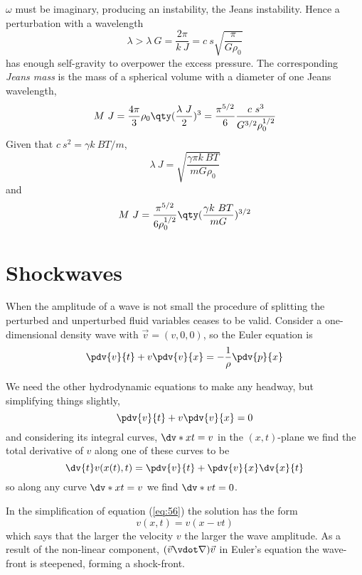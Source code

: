 $\omega$ must be imaginary, producing an instability, the Jeans
instability. Hence a perturbation with a wavelength
\[ \lambda > \lambda~G = \frac{2 \pi}{k~J} = c~s \sqrt{\frac{\pi}{G
    \rho_0}} \] has enough self-gravity to overpower the excess
pressure. The corresponding \emph{Jeans mass} is the mass of a
spherical volume with a diameter of one Jeans wavelength,
\begin{equation}
  \label{eq:70}
  M~J = \frac{4 \pi}{3} \rho_0 \qty( \frac{\lambda~J}{2})^3 = \frac{\pi^{5/2}}{6} \frac{c~s^3}{G^{3/2} \rho_0^{1/2}}
\end{equation}
Given that $c~s^2 = \gamma k~B T/m$,
\begin{equation}
  \label{eq:71}
  \lambda~J = \sqrt{\frac{\gamma \pi k~B T}{m G \rho_0}}
\end{equation}
and
\begin{equation}
  \label{eq:72}
  M~J = \frac{\pi^{5/2}}{6 \rho_0^{1/2}} \qty( \frac{\gamma k~B T}{m G} )^{3/2}
\end{equation}

\section{Shockwaves}
\label{sec:shockwaves}

When the amplitude of a wave is not small the procedure of splitting
the perturbed and unperturbed fluid variables ceases to be
valid. Consider a one-dimensional density wave with $\vec{v} =
(v,0,0)$, so the Euler equation is
\begin{equation}
  \label{eq:56}
  \pdv{v}{t} + v \pdv{v}{x} = - \frac{1}{\rho} \pdv{p}{x}
\end{equation}

We need the other hydrodynamic equations to make any headway, but
simplifying things slightly,
\begin{equation*}
  \pdv{v}{t} + v \pdv{v}{x} = 0
\end{equation*}
and considering its integral curves, $\dv*{x}{t} = v$ in the
$(x,t)$-plane we find the total derivative of $v$ along one of these
curves to be
\[ \dv{t} v(x(t),t) = \pdv{v}{t} + \pdv{v}{x} \dv{x}{t} \]
so along any curve $\dv*{x}{t}=v$ we find $\dv*{v}{t}=0$.

In the simplification of equation (\ref{eq:56}) the solution has the
form \[ v(x,t) = v(x-vt) \] which says that the larger the velocity
$v$ the larger the wave amplitude. As a result of the non-linear
component, $(\vec{v} \vdot \nabla) \vec{v}$ in Euler's equation the
wave-front is steepened, forming a shock-front.

